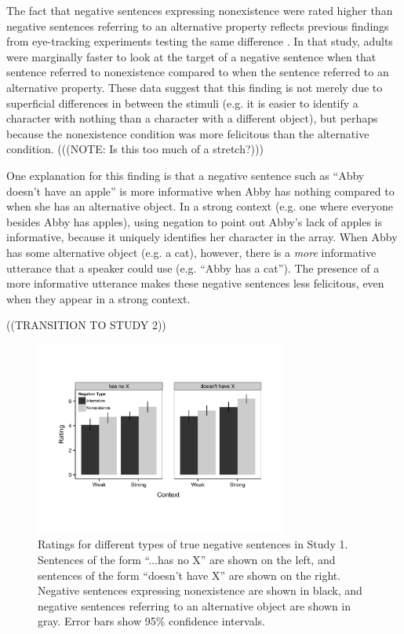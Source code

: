 \documentclass[10pt,letterpaper]{article}
\begin{document}
The fact that negative sentences expressing nonexistence were rated higher than negative sentences referring to an alternative property reflects previous findings from eye-tracking experiments testing the same difference \cite{nordmeyer2014}.  In that study, adults were marginally faster to look at the target of a negative sentence when that sentence referred to nonexistence compared to when the sentence referred to an alternative property.  These data suggest that this finding is not merely due to superficial differences in between the stimuli (e.g. it is easier to identify a character with nothing than a character with a different object), but perhaps because the nonexistence condition was more felicitous than the alternative condition.  (((NOTE: Is this too much of a stretch?))) 

One explanation for this finding is that a negative sentence such as ``Abby doesn't have an apple'' is more informative when Abby has nothing compared to when she has an alternative object.  In a strong context (e.g. one where everyone besides Abby has apples), using negation to point out Abby's lack of apples is informative, because it uniquely identifies her character in the array.  When Abby has some alternative object (e.g. a cat), however, there is a \emph{more} informative utterance that a speaker could use (e.g. ``Abby has a cat'').  The presence of a more informative utterance makes these negative sentences less felicitous, even when they appear in a strong context.


((TRANSITION TO STUDY 2))


\begin{figure}
\begin{center} 
\includegraphics[width=3.25in]{figures/study1.pdf}
\caption{\label{fig:s1} Ratings for different types of true negative sentences in Study 1.  Sentences of the form ``...has no X'' are shown on the left, and sentences of the form ``doesn't have X'' are shown on the right.  Negative sentences expressing nonexistence are shown in black, and negative sentences referring to an alternative object are shown in gray.  Error bars show 95\% confidence intervals.}
\end{center} 
\end{figure}
\end{document}
